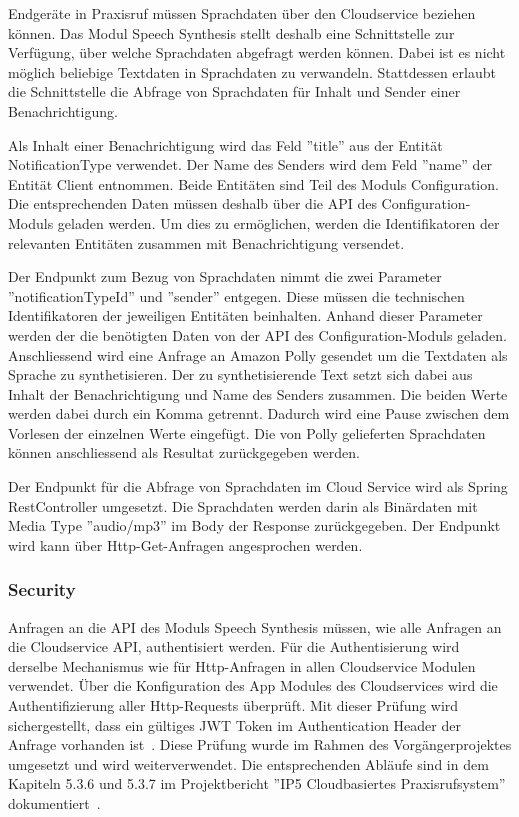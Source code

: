 Endgeräte in Praxisruf müssen Sprachdaten über den Cloudservice beziehen können.
Das Modul Speech Synthesis stellt deshalb eine Schnittstelle zur Verfügung, über welche Sprachdaten abgefragt werden können.
Dabei ist es nicht möglich beliebige Textdaten in Sprachdaten zu verwandeln.
Stattdessen erlaubt die Schnittstelle die Abfrage von Sprachdaten für Inhalt und Sender einer Benachrichtigung.

Als Inhalt einer Benachrichtigung wird das Feld ''title'' aus der Entität NotificationType verwendet.
Der Name des Senders wird dem Feld ''name'' der Entität Client entnommen.
Beide Entitäten sind Teil des Moduls Configuration.
Die entsprechenden Daten müssen deshalb über die API des Configuration-Moduls geladen werden.
Um dies zu ermöglichen, werden die Identifikatoren der relevanten Entitäten zusammen mit Benachrichtigung versendet.

Der Endpunkt zum Bezug von Sprachdaten nimmt die zwei Parameter ''notificationTypeId'' und ''sender'' entgegen.
Diese müssen die technischen Identifikatoren der jeweiligen Entitäten beinhalten.
Anhand dieser Parameter werden der die benötigten Daten von der API des Configuration-Moduls geladen.
Anschliessend wird eine Anfrage an Amazon Polly gesendet um die Textdaten als Sprache zu synthetisieren.
Der zu synthetisierende Text setzt sich dabei aus Inhalt der Benachrichtigung und Name des Senders zusammen.
Die beiden Werte werden dabei durch ein Komma getrennt.
Dadurch wird eine Pause zwischen dem Vorlesen der einzelnen Werte eingefügt.
Die von Polly gelieferten Sprachdaten können anschliessend als Resultat zurückgegeben werden.

Der Endpunkt für die Abfrage von Sprachdaten im Cloud Service wird als Spring RestController umgesetzt.
Die Sprachdaten werden darin als Binärdaten mit Media Type ''audio/mp3'' im Body der Response zurückgegeben.
Der Endpunkt wird kann über Http-Get-Anfragen angesprochen werden.

\subsubsection{Security}

Anfragen an die API des Moduls Speech Synthesis müssen, wie alle Anfragen an die Cloudservice API, authentisiert werden.
Für die Authentisierung wird derselbe Mechanismus wie für Http-Anfragen in allen Cloudservice Modulen verwendet.
Über die Konfiguration des App Modules des Cloudservices wird die Authentifizierung aller Http-Requests überprüft.
Mit dieser Prüfung wird sichergestellt, dass ein gültiges JWT Token im Authentication Header der Anfrage vorhanden ist~\cite{ip5}.
Diese Prüfung wurde im Rahmen des Vorgängerprojektes umgesetzt und wird weiterverwendet.
Die entsprechenden Abläufe sind in dem Kapiteln 5.3.6 und 5.3.7 im Projektbericht ''IP5 Cloudbasiertes Praxisrufsystem'' dokumentiert~\cite{ip5}.

